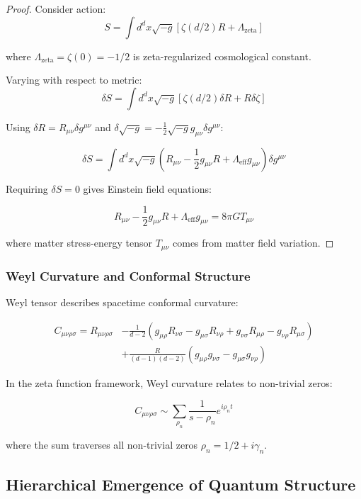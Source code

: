 \documentclass[12pt,a4paper]{article}
\begin{document}
\begin{proof}
Consider action:
$$S = \int d^d x \sqrt{-g} \left[ \zeta(d/2) R + \Lambda_{\text{zeta}} \right]$$

where $\Lambda_{\text{zeta}} = \zeta(0) = -1/2$ is zeta-regularized cosmological constant.

Varying with respect to metric:
$$\delta S = \int d^d x \sqrt{-g} \left[ \zeta(d/2) \delta R + R \delta \zeta \right]$$

Using $\delta R = R_{\mu\nu} \delta g^{\mu\nu}$ and $\delta \sqrt{-g} = -\frac{1}{2} \sqrt{-g} g_{\mu\nu} \delta g^{\mu\nu}$:

$$\delta S = \int d^d x \sqrt{-g} \left( R_{\mu\nu} - \frac{1}{2} g_{\mu\nu} R + \Lambda_{\text{eff}} g_{\mu\nu} \right) \delta g^{\mu\nu}$$

Requiring $\delta S = 0$ gives Einstein field equations:

$$R_{\mu\nu} - \frac{1}{2} g_{\mu\nu} R + \Lambda_{\text{eff}} g_{\mu\nu} = 8\pi G T_{\mu\nu}$$

where matter stress-energy tensor $T_{\mu\nu}$ comes from matter field variation.
\end{proof}

\subsubsection{Weyl Curvature and Conformal Structure}

Weyl tensor describes spacetime conformal curvature:

\begin{align}
C_{\mu\nu\rho\sigma} = R_{\mu\nu\rho\sigma} &- \frac{1}{d-2}(g_{\mu\rho} R_{\nu\sigma} - g_{\mu\sigma} R_{\nu\rho} + g_{\nu\sigma} R_{\mu\rho} - g_{\nu\rho} R_{\mu\sigma}) \\
&+ \frac{R}{(d-1)(d-2)}(g_{\mu\rho} g_{\nu\sigma} - g_{\mu\sigma} g_{\nu\rho})
\end{align}

In the zeta function framework, Weyl curvature relates to non-trivial zeros:

$$C_{\mu\nu\rho\sigma} \sim \sum_{\rho_n} \frac{1}{s - \rho_n} e^{i\rho_n t}$$

where the sum traverses all non-trivial zeros $\rho_n = 1/2 + i\gamma_n$.

\subsection{Hierarchical Emergence of Quantum Structure}
\end{document}
